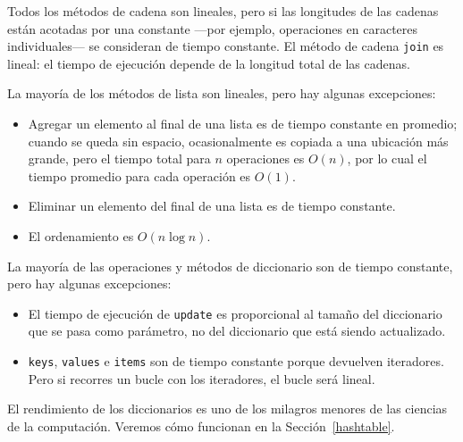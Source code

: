 \documentclass[10pt]{book}
\begin{document}
Todos los métodos de cadena son lineales, pero si las longitudes de las
cadenas están acotadas por una constante ---por ejemplo, operaciones en caracteres
individuales--- se consideran de tiempo constante.
El método de cadena {\tt join} es lineal: el tiempo de ejecución depende de
la longitud total de las cadenas.

La mayoría de los métodos de lista son lineales, pero hay algunas excepciones:

\begin{itemize}

\item Agregar un elemento al final de una lista es de tiempo constante en
promedio; cuando se queda sin espacio, ocasionalmente es copiada
a una ubicación más grande, pero el tiempo total para $n$ operaciones
es $O(n)$, por lo cual el tiempo promedio para cada
operación es $O(1)$.

\item Eliminar un elemento del final de una lista es de tiempo constante.

\item El ordenamiento es $O(n \log n)$.

\end{itemize}

La mayoría de las operaciones y métodos de diccionario son de tiempo constante, pero
hay algunas excepciones:

\begin{itemize}

\item El tiempo de ejecución de {\tt update} es
  proporcional al tamaño del diccionario que se pasa como parámetro,
  no del diccionario que está siendo actualizado.

\item {\tt keys}, {\tt values} e {\tt items} son de tiempo constante porque
  devuelven iteradores.  Pero
  si recorres un bucle con los iteradores, el bucle será lineal.

\end{itemize}

El rendimiento de los diccionarios es uno de los milagros menores de
las ciencias de la computación.  Veremos cómo funcionan en la
Sección~\ref{hashtable}.
\end{document}
